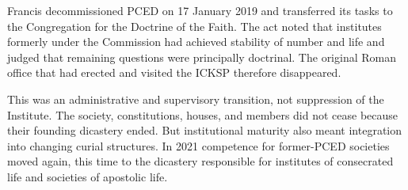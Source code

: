Francis decommissioned PCED on 17 January 2019 and transferred its tasks to the Congregation for the Doctrine of the Faith. The act noted that institutes formerly under the Commission had achieved stability of number and life and judged that remaining questions were principally doctrinal. The original Roman office that had erected and visited the ICKSP therefore disappeared.

This was an administrative and supervisory transition, not suppression of the Institute. The society, constitutions, houses, and members did not cease because their founding dicastery ended. But institutional maturity also meant integration into changing curial structures. In 2021 competence for former-PCED societies moved again, this time to the dicastery responsible for institutes of consecrated life and societies of apostolic life.


